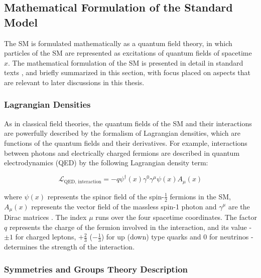 \subsection{Mathematical Formulation of the Standard Model}

The SM is formulated mathematically as a quantum field theory, in which particles of the SM are represented as excitations of quantum fields of spacetime \(x\). The mathematical formulation of the SM is presented in detail in standard texts \cite{griffiths_2008, SM_intro}, and briefly summarized in this section, with focus placed on aspects that are relevant to later discussions in this thesis.

\subsubsection{Lagrangian Densities}

As in classical field theories, the quantum fields of the SM and their interactions are powerfully described by the formalism of Lagrangian densities, which are functions of the quantum fields and their derivatives. For example, interactions between photons and electrically charged fermions are described in quantum electrodynamics (QED) by the following Lagrangian density term:

\begin{equation}
\label{eq:qed_interaction}
\mathcal{L}_\text{QED, interaction} = -q\psi^\dagger(x)\gamma^0\gamma^\mu\psi(x) A_\mu(x)
\end{equation}

\noindent where \(\psi(x)\) represents the spinor field of the spin-\(\frac{1}{2}\) fermions in the SM, \(A_\mu(x)\) represents the vector field of the massless spin-1 photon and \(\gamma^\mu\) are the Dirac matrices \cite{griffiths_2008}. The index \(\mu\) runs over the four spacetime coordinates. The factor \(q\) represents the charge of the fermion involved in the interaction, and its value - \(\pm1\) for charged leptons, \(+\frac{2}{3}\) (\(-\frac{1}{3}\)) for up (down) type quarks and 0 for neutrinos - determines the strength of the interaction. 

\subsubsection{Symmetries and Groups Theory Description}

